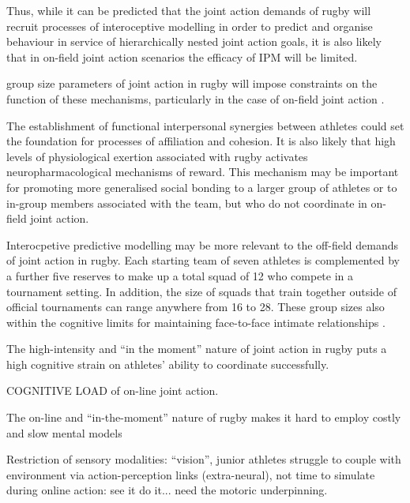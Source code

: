 \begin{CJK}{UTF8}{gbsn}
  Thus, while it can be predicted that the joint action demands of rugby will recruit processes of interoceptive modelling in order to predict and organise behaviour in service of hierarchically nested joint action goals, it is also likely that in on-field joint action scenarios the efficacy of IPM will be limited.



   group size parameters of joint action in rugby will impose constraints on the function of these mechanisms, particularly in the case of on-field joint action \citep{Mogan2017}.









  The establishment of functional interpersonal synergies between athletes could set the foundation for processes of affiliation and cohesion\citep{Marsh2009}.  It is also likely that high levels of physiological exertion associated with rugby activates neuropharmacological mechanisms of reward.  This mechanism may be important for promoting more generalised social bonding to a larger group of athletes or to in-group members associated with the team, but who do not coordinate in on-field joint action.


  Interocpetive predictive modelling may be more relevant to the off-field demands of joint action in rugby.  Each starting team of seven athletes is complemented by a further five reserves to make up a total squad of 12 who compete in a tournament setting.  In addition, the size of squads that train together outside of official tournaments can range anywhere from 16 to 28.  These group sizes also within the cognitive limits for maintaining face-to-face intimate relationships \citep[thought to be in the realm of 15-25, see][]{Dunbar1992,Dunbar2010}.



  The high-intensity and ``in the moment'' nature of joint action in rugby puts a high cognitive strain on athletes' ability to coordinate successfully.

  COGNITIVE LOAD of on-line joint action.

  The on-line and ``in-the-moment'' nature of rugby makes it hard to employ costly and slow mental models

  Restriction of sensory modalities: ``vision'', junior athletes struggle to couple with environment via action-perception links (extra-neural), not time to simulate during online action: see it do it... need the motoric underpinning.


\end{CJK}
